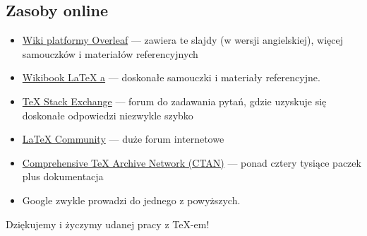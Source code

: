 \documentclass{beamer}
\begin{document}
\subsection{Zasoby online}
\begin{frame}{\insertsubsection}
\begin{itemize}
\item \href{https://www.overleaf.com/learn}{Wiki platformy Overleaf} ---
zawiera te slajdy (w wersji angielskiej), więcej samouczków i materiałów referencyjnych
\item \href{http://en.wikibooks.org/wiki/LaTeX}{Wikibook \LaTeX{} a} ---
doskonałe samouczki i materiały referencyjne.
\item \href{http://tex.stackexchange.com/}{\TeX{} Stack Exchange} --- forum do zadawania pytań, gdzie uzyskuje się doskonałe odpowiedzi niezwykle szybko
\item \href{http://www.latex-community.org/}{\LaTeX{} Community} --- duże forum internetowe
\item \href{http://ctan.org/}{Comprehensive \TeX{} Archive Network (CTAN)} ---
ponad cztery tysiące paczek plus dokumentacja
\item Google zwykle prowadzi do jednego z powyższych.
\end{itemize}
\end{frame}

\begin{frame}
\begin{center}
Dziękujemy i życzymy udanej pracy z \TeX{}-em!
\end{center}
\end{frame}
\end{document}
